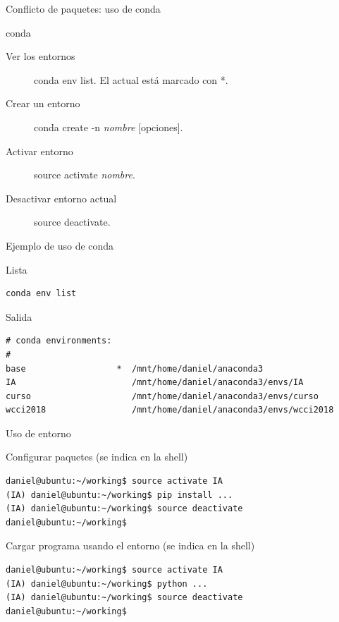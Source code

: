 \documentclass[bigger,unknownkeysallowed]{beamer}
\begin{document}
\begin{frame}[label={sec:org7c973e3}]{Conflicto de paquetes: uso de conda}
\begin{block}{conda}
\begin{description}
\item[{Ver los entornos}] conda env list. El actual está marcado con *.

\item[{Crear un entorno}] conda create -n \emph{nombre} [opciones].

\item[{Activar entorno}] source activate \emph{nombre}.

\item[{Desactivar entorno actual}] source deactivate.
\end{description}
\end{block}
\end{frame}

\begin{frame}[fragile,label={sec:org007d1fc}]{Ejemplo de uso de conda}
 \begin{block}{Lista}
\begin{verbatim}
conda env list
\end{verbatim}
\end{block}

\begin{block}{Salida}
\scriptsize
\begin{verbatim}
# conda environments:
#
base                  *  /mnt/home/daniel/anaconda3
IA                       /mnt/home/daniel/anaconda3/envs/IA
curso                    /mnt/home/daniel/anaconda3/envs/curso
wcci2018                 /mnt/home/daniel/anaconda3/envs/wcci2018
\end{verbatim}
\end{block}
\end{frame}

\begin{frame}[fragile,label={sec:orged9843e}]{Uso de entorno}
 \begin{exampleblock}{Configurar paquetes (se indica en la shell)}
\begin{verbatim}
daniel@ubuntu:~/working$ source activate IA
(IA) daniel@ubuntu:~/working$ pip install ...
(IA) daniel@ubuntu:~/working$ source deactivate
daniel@ubuntu:~/working$ 
\end{verbatim}
\end{exampleblock}

\begin{exampleblock}{Cargar programa usando el entorno (se indica en la shell)}
\begin{verbatim}
daniel@ubuntu:~/working$ source activate IA
(IA) daniel@ubuntu:~/working$ python ...
(IA) daniel@ubuntu:~/working$ source deactivate
daniel@ubuntu:~/working$ 
\end{verbatim}
\end{exampleblock}
\end{frame}
\end{document}
